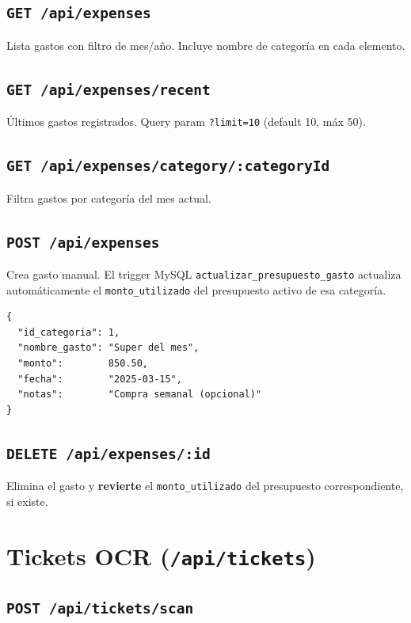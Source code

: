 \subsection{\texttt{GET /api/expenses}}
Lista gastos con filtro de mes/año. Incluye nombre de categoría en cada elemento.

\subsection{\texttt{GET /api/expenses/recent}}
Últimos gastos registrados. Query param \texttt{?limit=10} (default 10, máx 50).

\subsection{\texttt{GET /api/expenses/category/:categoryId}}
Filtra gastos por categoría del mes actual.

\subsection{\texttt{POST /api/expenses}}
Crea gasto manual. El trigger MySQL \texttt{actualizar\_presupuesto\_gasto} actualiza automáticamente el \texttt{monto\_utilizado} del presupuesto activo de esa categoría.
\begin{lstlisting}[style=json]
{
  "id_categoria": 1,
  "nombre_gasto": "Super del mes",
  "monto":        850.50,
  "fecha":        "2025-03-15",
  "notas":        "Compra semanal (opcional)"
}
\end{lstlisting}

\subsection{\texttt{DELETE /api/expenses/:id}}
Elimina el gasto y \textbf{revierte} el \texttt{monto\_utilizado} del presupuesto correspondiente, si existe.

\section{Tickets OCR (\texttt{/api/tickets})}

\subsection{\texttt{POST /api/tickets/scan}}

